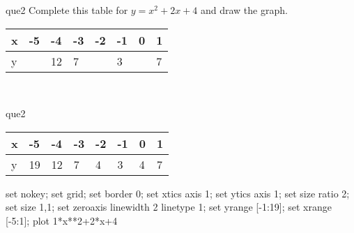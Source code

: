 \documentclass[13.5pt, varwidth=true]{beamer}
\begin{document}
\begin{frame}[shrink=19,fragile]
	\begin{beamercolorbox}[rounded=true, left, shadow=true,wd=14.8cm]{que2}
		 Complete this table for $y = x^{2} + 2x + 4$ and draw the graph. \\[0.3cm] \renewcommand{\arraystretch}{1.2}\begin{tabular}{|C|C|C|C|C|C|C|C|} \hline x & -5 & -4 & -3 & -2 & -1 & 0 & 1 \\ \hline y &  & 12 & 7 &  & 3 &  & 7\\ \hline \end{tabular}\\[0.3cm]
	\end{beamercolorbox}
\end{frame}
\begin{frame}[shrink=19,fragile]
	\begin{beamercolorbox}[rounded=true, left, shadow=true,wd=14.8cm]{que2}
		\renewcommand{\arraystretch}{1.2}\begin{tabular}{|C|C|C|C|C|C|C|C|} \hline x & -5 & -4 & -3 & -2 & -1 & 0 & 1 \\ \hline y & 19 & 12 & 7 & 4 & 3 & 4 & 7\\ \hline \end{tabular}\begin{gnuplot}[terminal=pdf] set nokey; set grid; set border 0; set xtics axis 1; set ytics axis 1; set size ratio 2; set size 1,1; set zeroaxis linewidth 2 linetype 1; set yrange [-1:19]; set xrange [-5:1]; plot 1*x**2+2*x+4 \end{gnuplot}
	\end{beamercolorbox}
\end{frame}
\end{document}
